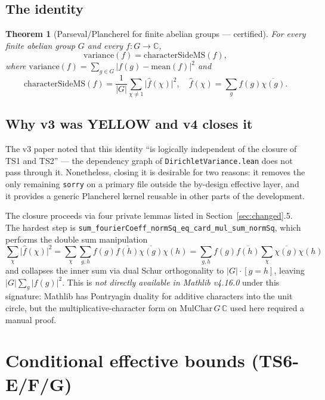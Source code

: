 \documentclass[11pt,a4paper]{article}
\newtheorem{theorem}{Theorem}[section]
\theoremstyle{definition}
\begin{document}
\subsection{The identity}

\begin{theorem}[Parseval/Plancherel for finite abelian groups --- certified]\label{thm:parseval}
For every finite abelian group $G$ and every $f : G \to \mathbb{C}$,
\[
  \mathrm{variance}(f) = \mathrm{characterSideMS}(f),
\]
where $\mathrm{variance}(f) = \sum_{g \in G} |f(g) - \mathrm{mean}(f)|^2$ and
\[
  \mathrm{characterSideMS}(f) = \frac{1}{|G|} \sum_{\chi \neq 1} \bigl|\widehat{f}(\chi)\bigr|^2,
  \quad \widehat{f}(\chi) = \sum_{g} f(g) \overline{\chi(g)}.
\]
\end{theorem}

\subsection{Why v3 was YELLOW and v4 closes it}

The v3 paper noted that this identity ``is logically independent of the closure of TS1 and TS2'' --- the dependency graph of \verb|DirichletVariance.lean| does not pass through it. Nonetheless, closing it is desirable for two reasons: it removes the only remaining \texttt{sorry} on a primary file outside the by-design effective layer, and it provides a generic Plancherel kernel reusable in other parts of the development.

The closure proceeds via four private lemmas listed in Section~\ref{sec:changed}.5. The hardest step is \verb|sum_fourierCoeff_normSq_eq_card_mul_sum_normSq|, which performs the double sum manipulation
\[
  \sum_{\chi} \bigl|\widehat{f}(\chi)\bigr|^2 = \sum_{\chi} \sum_{g, h} f(g) \overline{f(h)} \overline{\chi(g)} \chi(h) = \sum_{g, h} f(g) \overline{f(h)} \!\!\!\sum_{\chi} \overline{\chi(g)} \chi(h)
\]
and collapses the inner sum via dual Schur orthogonality to $|G| \cdot [g = h]$, leaving $|G| \sum_g |f(g)|^2$. This is \emph{not directly available in Mathlib v4.16.0} under this signature: Mathlib has Pontryagin duality for additive characters into the unit circle, but the multiplicative-character form on $\mathrm{MulChar}\,G\,\mathbb{C}$ used here required a manual proof.

\section{Conditional effective bounds (TS6-E/F/G)}\label{sec:effective}
\end{document}
